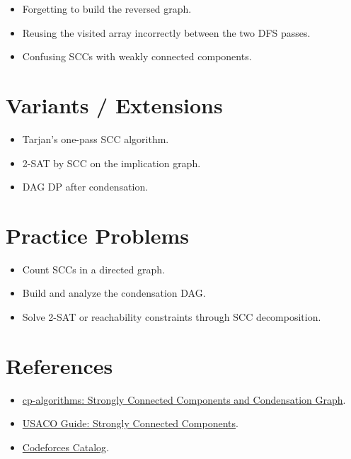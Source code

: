 \begin{itemize}
  \item Forgetting to build the reversed graph.
  \item Reusing the visited array incorrectly between the two DFS passes.
  \item Confusing SCCs with weakly connected components.
\end{itemize}

\section*{Variants / Extensions}

\begin{itemize}
  \item Tarjan's one-pass SCC algorithm.
  \item 2-SAT by SCC on the implication graph.
  \item DAG DP after condensation.
\end{itemize}

\section*{Practice Problems}

\begin{itemize}
  \item Count SCCs in a directed graph.
  \item Build and analyze the condensation DAG.
  \item Solve 2-SAT or reachability constraints through SCC decomposition.
\end{itemize}

\section*{References}

\begin{itemize}
  \item \href{https://cp-algorithms.com/graph/strongly-connected-components.html}{cp-algorithms: Strongly Connected Components and Condensation Graph}.
  \item \href{https://usaco.guide/adv/SCC?lang=cpp}{USACO Guide: Strongly Connected Components}.
  \item \href{https://codeforces.com/catalog}{Codeforces Catalog}.
\end{itemize}
